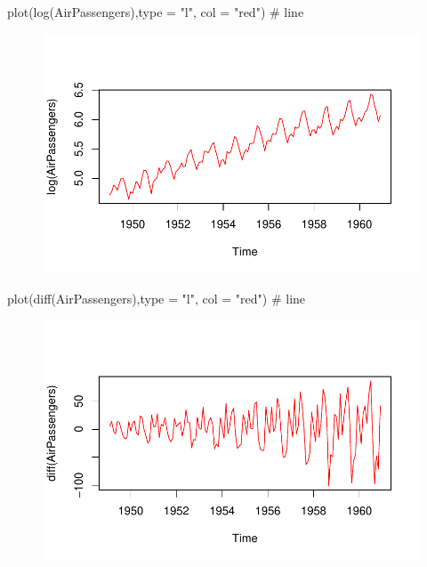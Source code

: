 \documentclass[
  letterpaper,
  DIV=11,
  numbers=noendperiod]{scrreprt}
\newenvironment{Shaded}{\begin{snugshade}}{\end{snugshade}}
\newcommand{\AttributeTok}[1]{\textcolor[rgb]{0.40,0.45,0.13}{#1}}
\newcommand{\CommentTok}[1]{\textcolor[rgb]{0.37,0.37,0.37}{#1}}
\newcommand{\FunctionTok}[1]{\textcolor[rgb]{0.28,0.35,0.67}{#1}}
\newcommand{\NormalTok}[1]{\textcolor[rgb]{0.00,0.23,0.31}{#1}}
\newcommand{\StringTok}[1]{\textcolor[rgb]{0.13,0.47,0.30}{#1}}
\begin{document}
\begin{Shaded}
\begin{Highlighting}[]
\FunctionTok{plot}\NormalTok{(}\FunctionTok{log}\NormalTok{(AirPassengers),}\AttributeTok{type =} \StringTok{"l"}\NormalTok{, }\AttributeTok{col =} \StringTok{"red"}\NormalTok{) }\CommentTok{\# line}
\end{Highlighting}
\end{Shaded}

\begin{figure}[H]

{\centering \includegraphics{data_analysis_files/figure-pdf/unnamed-chunk-5-4.pdf}

}

\end{figure}

\begin{Shaded}
\begin{Highlighting}[]
\FunctionTok{plot}\NormalTok{(}\FunctionTok{diff}\NormalTok{(AirPassengers),}\AttributeTok{type =} \StringTok{"l"}\NormalTok{, }\AttributeTok{col =} \StringTok{"red"}\NormalTok{) }\CommentTok{\# line}
\end{Highlighting}
\end{Shaded}

\begin{figure}[H]

{\centering \includegraphics{data_analysis_files/figure-pdf/unnamed-chunk-5-5.pdf}

}

\end{figure}
\end{document}
